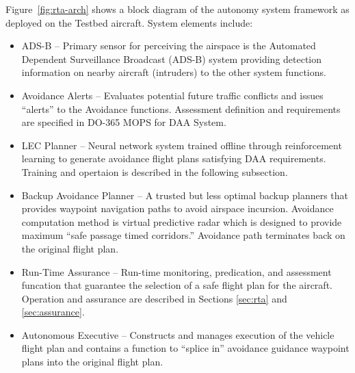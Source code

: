 Figure~\ref{fig:rta-arch} shows a block diagram of the autonomy system framework as deployed on the Testbed aircraft.
System elements include: 
\begin{itemize}
\item ADS-B – Primary sensor for perceiving the airspace is the Automated Dependent Surveillance Broadcast (ADS-B) system providing detection information on  nearby aircraft (intruders) to the other system functions.
\item Avoidance Alerts – Evaluates potential future traffic conflicts and issues “alerts” to the Avoidance functions.  Assessment definition and requirements are specified in DO-365 MOPS for DAA System.
\item LEC Planner -- Neural network system trained offline through reinforcement learning to generate avoidance flight plans satisfying DAA requirements.  Training and opertaion is described in the following subsection.  
\item Backup Avoidance Planner – A trusted but less optimal backup planners that provides waypoint navigation paths to avoid airspace incursion.  Avoidance computation method is virtual predictive radar which is designed to provide maximum ``safe passage timed corridors.''  Avoidance path terminates back on the original flight plan.
\item Run-Time Assurance  – Run-time monitoring, predication, and assessment funcation that guarantee the selection of a safe flight plan for the aircraft.  Operation and assurance are described in Sections \ref{sec:rta} and \ref{sec:assurance}.
\item Autonomous Executive – Constructs and manages execution of the vehicle flight plan and contains a function to ``splice in'' avoidance guidance waypoint plans into the original flight plan.
\end{itemize}


